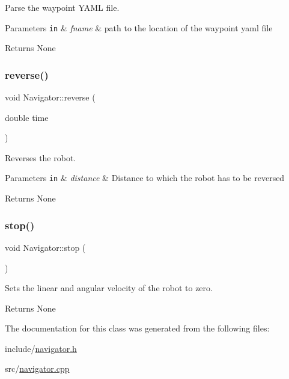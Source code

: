 Parse the waypoint Y\+A\+ML file. 


\begin{DoxyParams}[1]{Parameters}
\mbox{\tt in}  & {\em fname} & path to the location of the waypoint yaml file\\
\hline
\end{DoxyParams}
\begin{DoxyReturn}{Returns}
None 
\end{DoxyReturn}
\mbox{\label{class_navigator_aeb0340cdf97f9bd06e3903d5a287cf4f}} 
\subsubsection{\texorpdfstring{reverse()}{reverse()}}
{\footnotesize\ttfamily void Navigator\+::reverse (\begin{DoxyParamCaption}\item[{double}]{time }\end{DoxyParamCaption})}



Reverses the robot. 


\begin{DoxyParams}[1]{Parameters}
\mbox{\tt in}  & {\em distance} & Distance to which the robot has to be reversed\\
\hline
\end{DoxyParams}
\begin{DoxyReturn}{Returns}
None 
\end{DoxyReturn}
\mbox{\label{class_navigator_aefba9b9c3ef40f77e2b998d56a870f2d}} 
\subsubsection{\texorpdfstring{stop()}{stop()}}
{\footnotesize\ttfamily void Navigator\+::stop (\begin{DoxyParamCaption}{ }\end{DoxyParamCaption})}



Sets the linear and angular velocity of the robot to zero. 

\begin{DoxyReturn}{Returns}
None 
\end{DoxyReturn}


The documentation for this class was generated from the following files\+:\begin{DoxyCompactItemize}
\item 
include/\hyperlink{navigator_8h}{navigator.\+h}\item 
src/\hyperlink{navigator_8cpp}{navigator.\+cpp}\end{DoxyCompactItemize}
